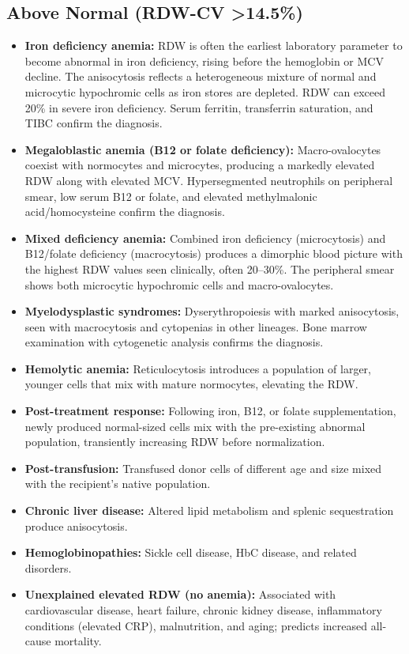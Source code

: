 \subsection*{Above Normal (RDW-CV >14.5\%)}
\begin{itemize}
  \item \textbf{Iron deficiency anemia:} RDW is often the earliest laboratory parameter to become abnormal in iron deficiency, rising before the hemoglobin or MCV decline. The anisocytosis reflects a heterogeneous mixture of normal and microcytic hypochromic cells as iron stores are depleted. RDW can exceed 20\% in severe iron deficiency. Serum ferritin, transferrin saturation, and TIBC confirm the diagnosis.
  \item \textbf{Megaloblastic anemia (B12 or folate deficiency):} Macro-ovalocytes coexist with normocytes and microcytes, producing a markedly elevated RDW along with elevated MCV. Hypersegmented neutrophils on peripheral smear, low serum B12 or folate, and elevated methylmalonic acid/homocysteine confirm the diagnosis.
  \item \textbf{Mixed deficiency anemia:} Combined iron deficiency (microcytosis) and B12/folate deficiency (macrocytosis) produces a dimorphic blood picture with the highest RDW values seen clinically, often 20--30\%. The peripheral smear shows both microcytic hypochromic cells and macro-ovalocytes.
  \item \textbf{Myelodysplastic syndromes:} Dyserythropoiesis with marked anisocytosis, seen with macrocytosis and cytopenias in other lineages. Bone marrow examination with cytogenetic analysis confirms the diagnosis.
  \item \textbf{Hemolytic anemia:} Reticulocytosis introduces a population of larger, younger cells that mix with mature normocytes, elevating the RDW.
  \item \textbf{Post-treatment response:} Following iron, B12, or folate supplementation, newly produced normal-sized cells mix with the pre-existing abnormal population, transiently increasing RDW before normalization.
  \item \textbf{Post-transfusion:} Transfused donor cells of different age and size mixed with the recipient's native population.
  \item \textbf{Chronic liver disease:} Altered lipid metabolism and splenic sequestration produce anisocytosis.
  \item \textbf{Hemoglobinopathies:} Sickle cell disease, HbC disease, and related disorders.
  \item \textbf{Unexplained elevated RDW (no anemia):} Associated with cardiovascular disease, heart failure, chronic kidney disease, inflammatory conditions (elevated CRP), malnutrition, and aging; predicts increased all-cause mortality.
\end{itemize}

